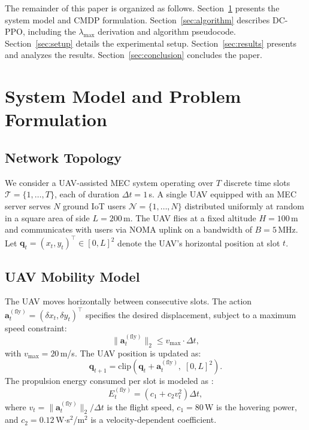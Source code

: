 \documentclass[journal]{IEEEtran}
\begin{document}
The remainder of this paper is organized as follows.
Section~\ref{sec:model} presents the system model and CMDP
formulation.
Section~\ref{sec:algorithm} describes DC-PPO, including the
$\lambda_{\max}$ derivation and algorithm pseudocode.
Section~\ref{sec:setup} details the experimental setup.
Section~\ref{sec:results} presents and analyzes the results.
Section~\ref{sec:conclusion} concludes the paper.

\section{System Model and Problem Formulation}\label{sec:model}

\subsection{Network Topology}

We consider a UAV-assisted MEC system operating over $T$ discrete
time slots $\mathcal{T} = \{1, \ldots, T\}$, each of duration
$\Delta t = 1$\,s.
A single UAV equipped with an MEC server serves $N$ ground IoT
users $\mathcal{N} = \{1, \ldots, N\}$ distributed uniformly at
random in a square area of side $L = 200$\,m.
The UAV flies at a fixed altitude $H = 100$\,m and communicates
with users via NOMA uplink on a bandwidth of $B = 5$\,MHz.
Let $\bm{q}_t = (x_t, y_t)^{\top} \in [0,L]^2$ denote the
UAV's horizontal position at slot $t$.

\subsection{UAV Mobility Model}

The UAV moves horizontally between consecutive slots.
The action $\bm{a}^{(\text{fly})}_t = (\delta x_t, \delta y_t)^{\top}$
specifies the desired displacement, subject to a maximum speed
constraint:
\begin{equation}
  \|\bm{a}^{(\text{fly})}_t\|_2 \le v_{\max} \cdot \Delta t,
  \label{eq:speed}
\end{equation}
with $v_{\max} = 20$\,m/s.
The UAV position is updated as:
\begin{equation}
  \bm{q}_{t+1} = \text{clip}\!\left(
    \bm{q}_t + \bm{a}^{(\text{fly})}_t,\; [0,L]^2
  \right).
  \label{eq:mobility}
\end{equation}
The propulsion energy consumed per slot is modeled as
\cite{zeng2019uav_survey}:
\begin{equation}
  E^{(\text{fly})}_t = \left(c_1 + c_2 v_t^2\right)\Delta t,
  \label{eq:fly_energy}
\end{equation}
where $v_t = \|\bm{a}^{(\text{fly})}_t\|_2 / \Delta t$ is the
flight speed, $c_1 = 80$\,W is the hovering power, and
$c_2 = 0.12$\,W$\cdot$s$^2$/m$^2$ is a velocity-dependent coefficient.
\end{document}
